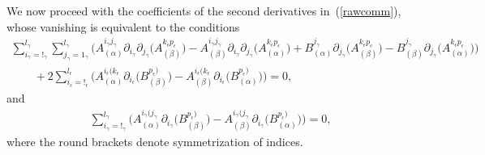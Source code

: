\documentclass[pdftex]{sigma}
\numberwithin{equation}{section}
\newcommand{\igamma}{i_{\gamma}}
\newcommand{\jgamma}{j_{\gamma}}
\newcommand{\lgamma}{l_{\gamma}}
\newcommand{\kepsilon}{k_{\epsilon}}
\newcommand{\pepsilon}{p_{\epsilon}}
\newcommand{\lepsilon}{l_{\epsilon}}
\newcommand{\iepsilon}{i_{\epsilon}}
\begin{document}
We now proceed with the coefficients of the second derivatives in~(\ref{rawcomm}), whose vanishing is equivalent to the conditions
\begin{gather}
\sum_{\igamma=!_{\gamma}}^{\lgamma}\sum_{\jgamma=1_{\gamma}}^{\lgamma}\big(A_{(\alpha)}^{\igamma \jgamma}\partial_{\igamma}\partial_{\jgamma}\big(A_{(\beta)}^{\kepsilon \pepsilon}\big)-A_{(\beta)}^{\igamma \jgamma}\partial_{\igamma}\partial_{\jgamma}\big(A_{(\alpha)}^{\kepsilon \pepsilon}\big)+B_{(\alpha)}^{\jgamma}\partial_{\jgamma}\big(A_{(\beta)}^{\kepsilon \pepsilon}\big)-B_{(\beta)}^{\jgamma}\partial_{\jgamma}\big(A_{(\alpha)}^{\kepsilon \pepsilon}\big)\big)\nonumber\\
\qquad{} +2\sum_{\iepsilon=!_{\epsilon}}^{\lepsilon}\big(A_{(\alpha)}^{\iepsilon (\kepsilon}\partial_{\iepsilon}\big(B_{(\beta)}^{\pepsilon )}\big)-A_{(\beta)}^{\iepsilon (\kepsilon}\partial_{\iepsilon}\big(B_{(\alpha)}^{\pepsilon )}\big)\big)=0,\label{2ndorder}
\end{gather}
and
\begin{gather}\label{2ndordermore}
\sum_{\igamma=!_{\gamma}}^{\lgamma}\big(A_{(\alpha)}^{\igamma (\jgamma}\partial_{\igamma}\big(B_{(\beta)}^{\pepsilon )}\big)-A_{(\beta)}^{\igamma (\jgamma}\partial_{\igamma}\big(B_{(\alpha)}^{\pepsilon )}\big)\big)=0,
\end{gather}
where the round brackets denote symmetrization of indices.
\end{document}
